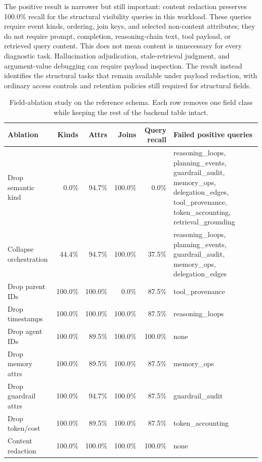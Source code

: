 \documentclass[conference]{IEEEtran}
\begin{document}
The positive result is narrower but still important: content redaction
preserves 100.0\% recall for the structural visibility queries in this
workload. These queries require event kinds, ordering, join keys, and
selected non-content attributes; they do not require prompt, completion,
reasoning-chain text, tool payload, or retrieved query content. This
does not mean content is unnecessary for every diagnostic task.
Hallucination adjudication, stale-retrieval judgment, and argument-value
debugging can require payload inspection. The result instead identifies
the structural tasks that remain available under payload redaction, with
ordinary access controls and retention policies still required for
structural fields.

\begin{table}[t]
\centering
\scriptsize
\caption{Field-ablation study on the reference schema. Each row removes
one field class while keeping the rest of the backend table intact.}
\label{tab:ablation}
\begin{tabular}{@{}lrrrrp{}@{}}
\toprule
Ablation & Kinds & Attrs & Joins & Query recall & Failed positive queries \\
\midrule
Drop semantic kind & 0.0\% & 94.7\% & 100.0\% & 0.0\% & reasoning\_loops, planning\_events, guardrail\_audit, memory\_ops, delegation\_edges, tool\_provenance, token\_accounting, retrieval\_grounding \\
Collapse orchestration & 44.4\% & 94.7\% & 100.0\% & 37.5\% & reasoning\_loops, planning\_events, guardrail\_audit, memory\_ops, delegation\_edges \\
Drop parent IDs & 100.0\% & 100.0\% & 0.0\% & 87.5\% & tool\_provenance \\
Drop timestamps & 100.0\% & 100.0\% & 100.0\% & 87.5\% & reasoning\_loops \\
Drop agent IDs & 100.0\% & 89.5\% & 100.0\% & 100.0\% & none \\
Drop memory attrs & 100.0\% & 89.5\% & 100.0\% & 87.5\% & memory\_ops \\
Drop guardrail attrs & 100.0\% & 94.7\% & 100.0\% & 87.5\% & guardrail\_audit \\
Drop token/cost & 100.0\% & 89.5\% & 100.0\% & 87.5\% & token\_accounting \\
Content redaction & 100.0\% & 100.0\% & 100.0\% & 100.0\% & none \\
\bottomrule
\end{tabular}
\end{table}
\end{document}
